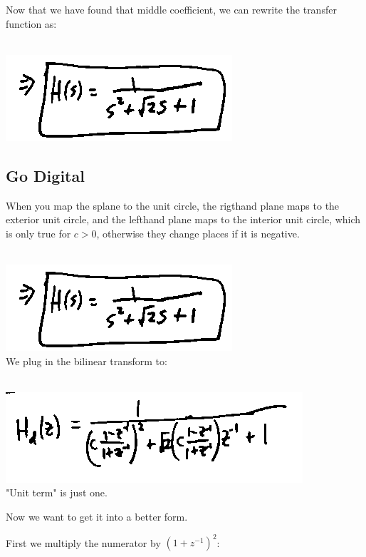 Now that we have found that middle coefficient, we can rewrite 
the transfer function as:

\\
\includegraphics[scale=0.5]{frames/17d}\\

\subsection*{Go Digital}

When you map the splane to the unit circle, the rigthand plane maps
to the exterior unit circle, and the lefthand plane maps to the interior unit circle,
which is only true for $c > 0$, otherwise they change places if it is negative.

\\
\includegraphics[scale=0.5]{frames/17d}\\

We plug in the bilinear transform to:

\\
\includegraphics[scale=0.5]{frames/17f}\\

"Unit term" is just one. 

Now we want to get it into a better form. 

First we multiply the numerator by $(1 + z^{-1})^2$:


